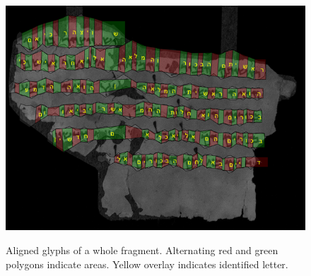\begin{figure}[t]

\includegraphics[width=1\columnwidth]{images/P702-Fg010-R-C01-R01-D12092012-T111025-LR924_012_F_rewrite._reordered_with_text._page_cutout.png}
  \label{fig:algn_regularAlignment}
  \vspace*{-5mm} \caption{Aligned glyphs of a whole fragment. Alternating red
	and green polygons indicate areas. Yellow overlay indicates identified
	letter.} \vspace*{-5mm} \label{fig:algn_align}
\end{figure}

